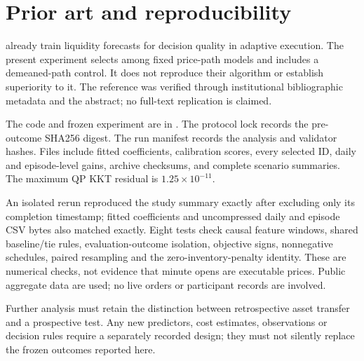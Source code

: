 \documentclass[11pt]{article}
\begin{document}
\section{Prior art and reproducibility}
\citet{kweon2024} already train liquidity forecasts for decision quality in adaptive execution. The present experiment selects among fixed price-path models and includes a demeaned-path control. It does not reproduce their algorithm or establish superiority to it. The reference was verified through institutional bibliographic metadata and the abstract; no full-text replication is claimed.

The code and frozen experiment are in . The protocol lock records the pre-outcome SHA256 digest. The run manifest records the analysis and validator hashes. Files include fitted coefficients, calibration scores, every selected ID, daily and episode-level gains, archive checksums, and complete scenario summaries. The maximum QP KKT residual is $1.25\times10^{-11}$.

An isolated rerun reproduced the study summary exactly after excluding only its completion timestamp; fitted coefficients and uncompressed daily and episode CSV bytes also matched exactly. Eight tests check causal feature windows, shared baseline/tie rules, evaluation-outcome isolation, objective signs, nonnegative schedules, paired resampling and the zero-inventory-penalty identity. These are numerical checks, not evidence that minute opens are executable prices. Public aggregate data are used; no live orders or participant records are involved.

Further analysis must retain the distinction between retrospective asset transfer and a prospective test. Any new predictors, cost estimates, observations or decision rules require a separately recorded design; they must not silently replace the frozen outcomes reported here.
\begingroup\raggedright\endgroup
\end{document}
